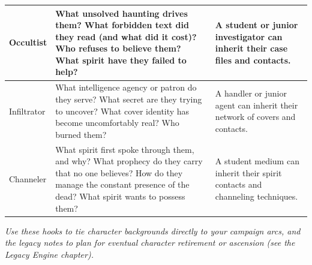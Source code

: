 \begin{longtable}{p{2.5cm} p{6.5cm} p{4cm}}
\midrule
Occultist &
\begin{minipage}[t]{6.5cm}
What unsolved haunting drives them? What forbidden text did they read (and what did it cost)? Who refuses to believe them? What spirit have they failed to help?
\end{minipage} &
A student or junior investigator can inherit their case files and contacts. \\
\midrule
Infiltrator &
\begin{minipage}[t]{6.5cm}
What intelligence agency or patron do they serve? What secret are they trying to uncover? What cover identity has become uncomfortably real? Who burned them?
\end{minipage} &
A handler or junior agent can inherit their network of covers and contacts. \\
\midrule
Channeler &
\begin{minipage}[t]{6.5cm}
What spirit first spoke through them, and why? What prophecy do they carry that no one believes? How do they manage the constant presence of the dead? What spirit wants to possess them?
\end{minipage} &
A student medium can inherit their spirit contacts and channeling techniques. \\
\bottomrule
\end{longtable}

\vspace{1em}
\noindent \textit{Use these hooks to tie character backgrounds directly to your campaign arcs, and the legacy notes to plan for eventual character retirement or ascension (see the Legacy Engine chapter).}
